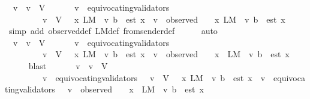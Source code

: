 \begin{isabellebody}
\ {\isachardoublequoteopen}{\isasymforall}\ v\ {\isasymsigma}{\isachardot}\ v\ {\isasymin}\ V\ {\isasymand}\ {\isasymsigma}\ {\isasymin}\ {\isasymSigma}\ {\isasymlongrightarrow}\ \ v\ {\isasymnotin}\ equivocating{\isacharunderscore}validators\ {\isasymsigma}\ \isanewline
\ \ \ \ \ \ \ \ {\isasymlongrightarrow}\ {\isacharparenleft}v\ {\isasymin}\ V\ {\isasymand}\ {\isacharparenleft}{\isasymexists}\ x\ {\isasymin}L{\isacharunderscore}M\ {\isasymsigma}\ v{\isachardot}\ b\ {\isasymdownharpoonright}\ est\ x{\isacharparenright}{\isacharparenright}\ {\isacharequal}\ {\isacharparenleft}v\ {\isasymin}\ observed\ {\isasymsigma}\ {\isasymand}\ {\isacharparenleft}{\isasymexists}\ x\ {\isasymin}L{\isacharunderscore}M\ {\isasymsigma}\ v{\isachardot}\ b\ {\isasymdownharpoonright}\ est\ x{\isacharparenright}{\isacharparenright}{\isachardoublequoteclose}\isanewline
\ \ \ \ \isamarkupfalse%
\ {\isacharparenleft}simp\ add{\isacharcolon}\ observed{\isacharunderscore}def\ L{\isacharunderscore}M{\isacharunderscore}def\ from{\isacharunderscore}sender{\isacharunderscore}def{\isacharparenright}\isanewline
\ \ \ \ \isamarkupfalse%
\ auto\isanewline
\ \ \isamarkupfalse%
\ \isamarkupfalse%
\ {\isachardoublequoteopen}{\isasymforall}\ v\ {\isasymsigma}{\isachardot}\ v\ {\isasymin}\ V\ {\isasymand}\ {\isasymsigma}\ {\isasymin}\ {\isasymSigma}\ {\isasymlongrightarrow}\ \ v\ {\isasymnotin}\ equivocating{\isacharunderscore}validators\ {\isasymsigma}\ \isanewline
\ \ \ \ \ \ \ \ {\isasymlongrightarrow}\ {\isacharparenleft}v\ {\isasymin}\ V\ {\isasymand}\ {\isacharparenleft}{\isasymexists}\ x\ {\isasymin}L{\isacharunderscore}M\ {\isasymsigma}\ v{\isachardot}\ b\ {\isasymdownharpoonright}\ est\ x{\isacharparenright}{\isacharparenright}\ {\isacharequal}\ {\isacharparenleft}v\ {\isasymin}\ observed\ {\isasymsigma}\ {\isasymand}\ {\isacharparenleft}{\isasymforall}\ x\ {\isasymin}\ L{\isacharunderscore}M\ {\isasymsigma}\ v{\isachardot}\ b\ {\isasymdownharpoonright}\ est\ x{\isacharparenright}{\isacharparenright}{\isachardoublequoteclose}\isanewline
\ \ \ \ \isamarkupfalse%
\ blast\isanewline
\ \ \isamarkupfalse%
\ \isamarkupfalse%
\ {\isachardoublequoteopen}{\isasymforall}\ v\ {\isasymsigma}{\isachardot}\ v\ {\isasymin}\ V\ {\isasymand}\ {\isasymsigma}\ {\isasymin}\ {\isasymSigma}\isanewline
\ \ \ \ \ \ \ \ {\isasymlongrightarrow}\ {\isacharparenleft}v\ {\isasymnotin}\ equivocating{\isacharunderscore}validators\ {\isasymsigma}\ {\isasymlongrightarrow}\ v\ {\isasymin}\ V\ {\isasymand}\ {\isacharparenleft}{\isasymexists}\ x\ {\isasymin}L{\isacharunderscore}M\ {\isasymsigma}\ v{\isachardot}\ b\ {\isasymdownharpoonright}\ est\ x{\isacharparenright}{\isacharparenright}\ {\isacharequal}\ {\isacharparenleft}v\ {\isasymnotin}\ equivocating{\isacharunderscore}validators\ {\isasymsigma}\ {\isasymlongrightarrow}\ v\ {\isasymin}\ observed\ {\isasymsigma}\ {\isasymand}\ {\isacharparenleft}{\isasymforall}\ x\ {\isasymin}\ L{\isacharunderscore}M\ {\isasymsigma}\ v{\isachardot}\ b\ {\isasymdownharpoonright}\ est\ x{\isacharparenright}{\isacharparenright}{\isachardoublequoteclose}\isanewline

\end{isabellebody}
